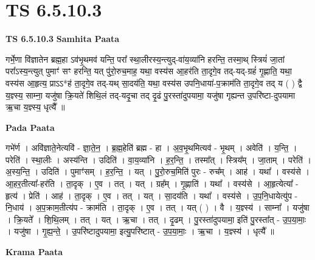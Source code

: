 \documentclass[17pt]{extarticle}
\begin{document}
\section{ TS 6.5.10.3 }

\textbf{TS 6.5.10.3 } \newline
\textbf{Samhita Paata} \newline

गर्भे॒णा वि॑ज्ञातेन ब्रह्म॒हा ऽव॑भृ॒थमव॑ यन्ति॒ परा᳚ स्था॒लीरस्य॒न्त्युद्-वा॑य॒व्या॑नि हरन्ति॒ तस्मा॒थ् स्त्रियं॑ जा॒तां परा᳚ऽस्य॒न्त्युत् पुमाꣳ॑ सꣳ हरन्ति॒ यत् पु॑रो॒रुच॒माह॒ यथा॒ वस्य॑स आ॒हर॑ति ता॒दृगे॒व तद्-यद्-ग्रहं॑ गृ॒ह्णाति॒ यथा॒ वस्य॑स आ॒हृत्य॒ प्राऽऽ*ह॑ ता॒दृगे॒व तद्-यथ् सा॒दय॑ति॒ यथा॒ वस्य॑स उपनि॒धाया॑-प॒क्राम॑ति ता॒दृगे॒व तद् य ( ) द्वै य॒ज्ञ्स्य॒ साम्ना॒ यजु॑षा क्रि॒यते॑ शिथि॒लं तद्-यदृ॒चा तद् दृ॒ढं पु॒रस्ता॑दुपयामा॒ यजु॑षा गृह्यन्त उ॒परि॑ष्टा-दुपयामा ऋ॒चा य॒ज्ञ्स्य॒ धृत्यै᳚ ॥ \newline

\textbf{Pada Paata} \newline

गभे॑र्ण । अवि॑ज्ञाते॒नेत्यवि॑ - ज्ञा॒ते॒न॒ । ब्र॒ह्म॒हेति॑ ब्रह्म - हा । अ॒व॒भृ॒थमित्यव॑ - भृ॒थम् । अवेति॑ । य॒न्ति॒ । परेति॑ । स्था॒लीः । अस्य॑न्ति । उदिति॑ । वा॒य॒व्या॑नि । ह॒र॒न्ति॒ । तस्मा᳚त् । स्त्रिय᳚म् । जा॒ताम् । परेति॑ । अ॒स्य॒न्ति॒ । उदिति॑ । पुमाꣳ॑सम् । ह॒र॒न्ति॒ । यत् । पु॒रो॒रुच॒मिति॑ पुरः - रुच᳚म् । आह॑ । यथा᳚ । वस्य॑से । आ॒हर॒तीत्या᳚-हर॑ति । ता॒दृक् । ए॒व । तत् । यत् । ग्रह᳚म् । गृ॒ह्णाति॑ । यथा᳚ । वस्य॑से । आ॒हृत्येत्या᳚ - हृत्य॑ । प्रेति॑ । आह॑ । ता॒दृक् । ए॒व । तत् । यत् । सा॒दय॑ति । यथा᳚ । वस्य॑से । उ॒प॒नि॒धायेत्यु॑प - नि॒धाय॑ । अ॒प॒क्राम॒तीत्य॑प - क्राम॑ति । ता॒दृक् । ए॒व । तत् । यत् ( ) । वै । य॒ज्ञ्स्य॑ । साम्ना᳚ । यजु॑षा । क्रि॒यते᳚ । शि॒थि॒लम् । तत् । यत् । ऋ॒चा । तत् । दृ॒ढम् । पु॒रस्ता॑दुपयामा॒ इति॑ पु॒रस्ता᳚त् - उ॒प॒या॒माः॒ । यजु॑षा । गृ॒ह्य॒न्ते॒ । उ॒परि॑ष्टादुपयामा॒ इत्यु॒परि॑ष्टात् - उ॒प॒या॒माः॒ । ऋ॒चा । य॒ज्ञ्स्य॑ । धृत्यै᳚ ॥  \newline


\textbf{Krama Paata} \newline
\end{document}
